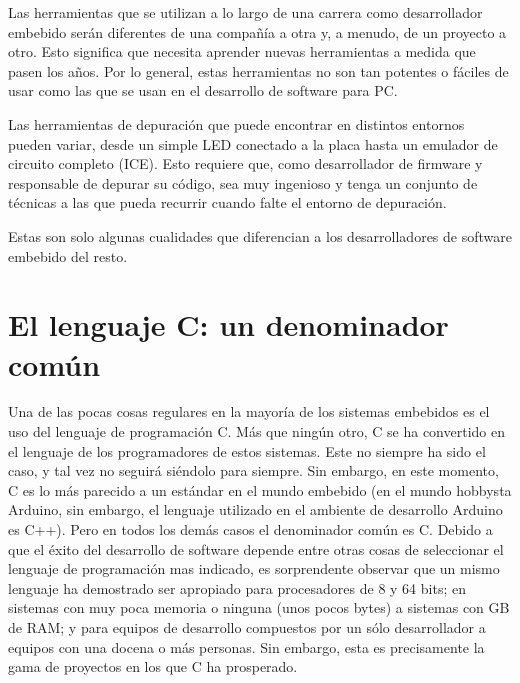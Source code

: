 \documentclass[output=paper, 
colorlinks,
citecolor=brown,
newtxmath
]{langscibook}
\begin{document}
Las herramientas que se utilizan a lo largo de una carrera 
como desarrollador embebido serán diferentes de una compañía a otra y, 
a menudo, de un proyecto a otro. Esto significa que necesita
aprender nuevas herramientas a medida que pasen los años.
Por lo general, estas herramientas no son tan potentes 
o fáciles de usar como las que se usan en el desarrollo de software para PC.

Las herramientas de depuración que puede encontrar en distintos entornos
pueden variar, desde un simple LED conectado a la placa hasta un emulador de 
circuito completo (ICE). Esto requiere que, como desarrollador de firmware y responsable de depurar 
su código, sea muy ingenioso y tenga un conjunto de técnicas a las que pueda recurrir
cuando falte el entorno de depuración. 

Estas son solo algunas cualidades que diferencian a los desarrolladores 
de software embebido del resto.



\section {El lenguaje C: un denominador común}

Una de las pocas cosas regulares en la mayoría de los sistemas embebidos es el uso del 
lenguaje de programación C.
Más que ningún otro, C se ha convertido en el lenguaje de los programadores de estos sistemas. 
Este no siempre ha sido el caso, y tal vez no seguirá siéndolo para siempre. 
Sin embargo, en este momento, C es lo más parecido a un estándar en el mundo embebido (en el mundo hobbysta Arduino, sin embargo, el lenguaje utilizado en el ambiente de desarrollo Arduino es C++). Pero en todos los demás casos el denominador común es C. 
Debido a que el éxito del desarrollo de software depende entre otras cosas de seleccionar 
el lenguaje de programación mas indicado, es sorprendente observar que 
un mismo lenguaje ha demostrado ser apropiado para procesadores de 8 y 64 bits; 
en sistemas con muy poca memoria o ninguna (unos pocos bytes) a sistemas
con GB de RAM; y para equipos de desarrollo compuestos por un sólo desarrollador 
a equipos con una docena o más personas. 
Sin embargo, esta es precisamente la gama de proyectos en los que C ha prosperado.
\end{document}
